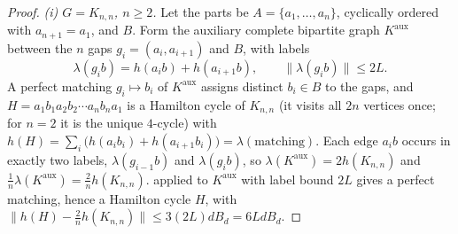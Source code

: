 \documentclass[11pt,a4paper]{article}
\theoremstyle{plain}
\theoremstyle{definition}
\theoremstyle{remark}
\begin{document}
\label{pf:main}
\thmmain*
\begin{proof}
\emph{(i) $G=K_{n,n}$, $n\ge2$.} Let the parts be $A=\{a_1,\dots,a_n\}$, cyclically ordered with $a_{n+1}=a_1$, and $B$. Form the auxiliary complete bipartite graph $K^{\mathrm{aux}}$ between the $n$ gaps $g_i=(a_i,a_{i+1})$ and $B$, with labels
\[
 \lambda(g_ib)=h(a_ib)+h(a_{i+1}b),\qquad\|\lambda(g_ib)\|\le2L .
\]
A perfect matching $g_i\mapsto b_i$ of $K^{\mathrm{aux}}$ assigns distinct $b_i\in B$ to the gaps, and $H=a_1b_1a_2b_2\cdots a_nb_na_1$ is a Hamilton cycle of $K_{n,n}$ (it visits all $2n$ vertices once; for $n=2$ it is the unique $4$-cycle) with $h(H)=\sum_i\bigl(h(a_ib_i)+h(a_{i+1}b_i)\bigr)=\lambda(\text{matching})$. Each edge $a_ib$ occurs in exactly two labels, $\lambda(g_{i-1}b)$ and $\lambda(g_ib)$, so $\lambda(K^{\mathrm{aux}})=2h(K_{n,n})$ and $\frac1n\lambda(K^{\mathrm{aux}})=\frac2nh(K_{n,n})$.  applied to $K^{\mathrm{aux}}$ with label bound $2L$ gives a perfect matching, hence a Hamilton cycle $H$, with $\|h(H)-\frac2nh(K_{n,n})\|\le3(2L)dB_d=6LdB_d$.


\end{proof}
\end{document}
